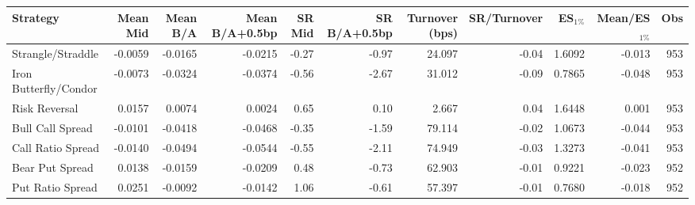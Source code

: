 \begin{tabular}{lrrrrrrrrrr}
\toprule
Strategy & Mean Mid & Mean B/A & Mean B/A+0.5bp & SR Mid & SR B/A+0.5bp & Turnover (bps) & SR/Turnover & ES$_{1\%}$ & Mean/ES$_{1\%}$ & Obs \\
\midrule
Strangle/Straddle & -0.0059 & -0.0165 & -0.0215 & -0.27 & -0.97 & 24.097 & -0.04 & 1.6092 & -0.013 & 953 \\
Iron Butterfly/Condor & -0.0073 & -0.0324 & -0.0374 & -0.56 & -2.67 & 31.012 & -0.09 & 0.7865 & -0.048 & 953 \\
Risk Reversal & 0.0157 & 0.0074 & 0.0024 & 0.65 & 0.10 & 2.667 & 0.04 & 1.6448 & 0.001 & 953 \\
Bull Call Spread & -0.0101 & -0.0418 & -0.0468 & -0.35 & -1.59 & 79.114 & -0.02 & 1.0673 & -0.044 & 953 \\
Call Ratio Spread & -0.0140 & -0.0494 & -0.0544 & -0.55 & -2.11 & 74.949 & -0.03 & 1.3273 & -0.041 & 953 \\
Bear Put Spread & 0.0138 & -0.0159 & -0.0209 & 0.48 & -0.73 & 62.903 & -0.01 & 0.9221 & -0.023 & 952 \\
Put Ratio Spread & 0.0251 & -0.0092 & -0.0142 & 1.06 & -0.61 & 57.397 & -0.01 & 0.7680 & -0.018 & 952 \\
\bottomrule
\end{tabular}

